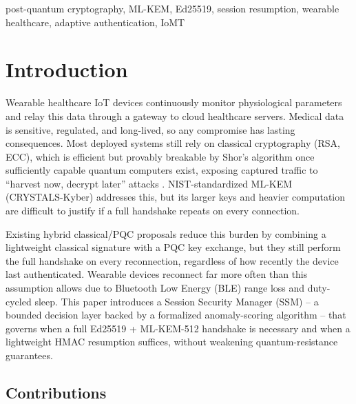 \documentclass[conference]{IEEEtran}
\begin{document}
\begin{IEEEkeywords}
post-quantum cryptography, ML-KEM, Ed25519, session resumption, wearable healthcare, adaptive authentication, IoMT
\end{IEEEkeywords}

\section{Introduction}

Wearable healthcare IoT devices continuously monitor physiological
parameters and relay this data through a gateway to cloud healthcare
servers. Medical data is sensitive, regulated, and long-lived, so any
compromise has lasting consequences. Most deployed systems still rely on
classical cryptography (RSA, ECC), which is efficient but provably breakable
by Shor's algorithm once sufficiently capable quantum computers exist,
exposing captured traffic to ``harvest now, decrypt later'' attacks
\cite{shor1994}. NIST-standardized ML-KEM (CRYSTALS-Kyber) \cite{fips203}
addresses this, but its larger keys and heavier computation are difficult to
justify if a full handshake repeats on every connection.

Existing hybrid classical/PQC proposals reduce this burden by combining a
lightweight classical signature with a PQC key exchange, but they still
perform the full handshake on every reconnection, regardless of how recently
the device last authenticated. Wearable devices reconnect far more often
than this assumption allows due to Bluetooth Low Energy (BLE) range loss and
duty-cycled sleep. This paper introduces a Session Security Manager (SSM) --
a bounded decision layer backed by a formalized anomaly-scoring algorithm --
that governs when a full Ed25519 + ML-KEM-512 handshake is necessary and
when a lightweight HMAC resumption suffices, without weakening
quantum-resistance guarantees.

\subsection{Contributions}
\end{document}
